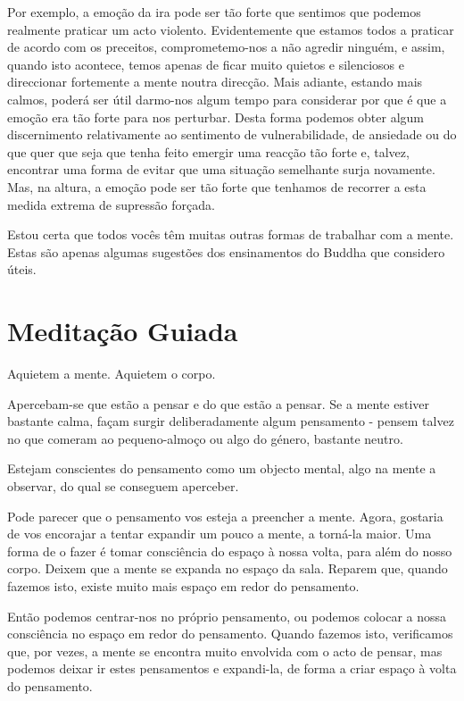Por exemplo, a emoção da ira pode ser tão forte que sentimos que podemos
realmente praticar um acto violento. Evidentemente que estamos todos a
praticar de acordo com os preceitos, comprometemo-nos a não agredir
ninguém, e assim, quando isto acontece, temos apenas de ficar muito
quietos e silenciosos e direccionar fortemente a mente noutra direcção.
Mais adiante, estando mais calmos, poderá ser útil darmo-nos algum tempo
para considerar por que é que a emoção era tão forte para nos perturbar.
Desta forma podemos obter algum discernimento relativamente ao
sentimento de vulnerabilidade, de ansiedade ou do que quer que seja que
tenha feito emergir uma reacção tão forte e, talvez, encontrar uma forma
de evitar que uma situação semelhante surja novamente. Mas, na altura, a
emoção pode ser tão forte que tenhamos de recorrer a esta medida extrema
de supressão forçada.

Estou certa que todos vocês têm muitas outras formas de trabalhar com a
mente. Estas são apenas algumas sugestões dos ensinamentos do Buddha que
considero úteis.

\clearpage

\section{Meditação Guiada}

Aquietem a mente. Aquietem o corpo.

Apercebam-se que estão a pensar e do que estão a pensar. Se a mente
estiver bastante calma, façam surgir deliberadamente algum pensamento -
pensem talvez no que comeram ao pequeno-almoço ou algo do género,
bastante neutro.

Estejam conscientes do pensamento como um objecto mental, algo na mente
a observar, do qual se conseguem aperceber.

Pode parecer que o pensamento vos esteja a preencher a mente. Agora,
gostaria de vos encorajar a tentar expandir um pouco a mente, a torná-la
maior. Uma forma de o fazer é tomar consciência do espaço à nossa volta,
para além do nosso corpo. Deixem que a mente se expanda no espaço da
sala. Reparem que, quando fazemos isto, existe muito mais espaço em
redor do pensamento.

Então podemos centrar-nos no próprio pensamento, ou podemos colocar a
nossa consciência no espaço em redor do pensamento. Quando fazemos isto,
verificamos que, por vezes, a mente se encontra muito envolvida com o
acto de pensar, mas podemos deixar ir estes pensamentos e expandi-la, de
forma a criar espaço à volta do pensamento.

